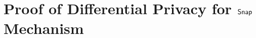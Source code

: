 \documentclass[a4paper,11pt]{article}
\begin{document}





\section{Proof of Differential Privacy for $\mathsf{Snap}$ Mechanism}
\end{document}
